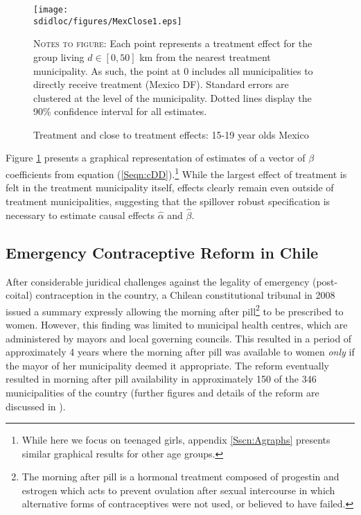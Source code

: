 \begin{figure}[h!]
\texttt{[image: \\sdidloc/figures/MexClose1.eps]}
\caption{Treatment and close to treatment effects: 15-19 year olds Mexico}
\label{SFig:MexClose}
\vspace{2mm}
\begin{footnotesize}
\textsc{Notes to figure}: Each point represents a treatment effect for the group
living $d\in [0,50]$ km from the nearest treatment municipality.  As such, the
point at 0 includes all municipalities to directly receive treatment (Mexico DF).
Standard errors are clustered at the level of the municipality.  Dotted lines 
display the 90\% confidence interval for all estimates.
\end{footnotesize}
\end{figure}
Figure \ref{SFig:MexClose} presents a graphical representation of estimates
of a vector of $\beta$ coefficients from equation (\ref{Seqn:cDD}).\footnote{
While here we focus on teenaged girls, appendix \ref{Sscn:Agraphs} presents
similar graphical results for other age groups.}  While the largest effect of 
treatment is felt in the treatment municipality itself, effects clearly remain 
even outside of treatment municipalities, suggesting that the spillover robust 
specification is necessary to estimate causal effects $\hat\alpha$ and 
$\hat\beta$.

\subsection{Emergency Contraceptive Reform in Chile}
After considerable juridical challenges against the legality of emergency 
(post-coital) contraception in the country, a Chilean constitutional tribunal in 
2008 issued a summary expressly allowing the morning after pill\footnote{The morning
  after pill is a hormonal treatment composed of progestin and estrogen which acts
to prevent ovulation after sexual intercourse in which alternative forms of 
contraceptives were not used, or believed to have failed.} to be prescribed
to women.  However, this finding was limited to municipal health centres, which
are administered by mayors and local governing councils.  This resulted in a 
period of approximately 4 years where the morning after pill was available to
women \emph{only} if the mayor of her municipality deemed it appropriate.  The
reform eventually resulted in morning after pill availability in approximately
150 of the 346 municipalities of the country (further figures and details of the
reform are discussed in \citet{Clarke2014}).


